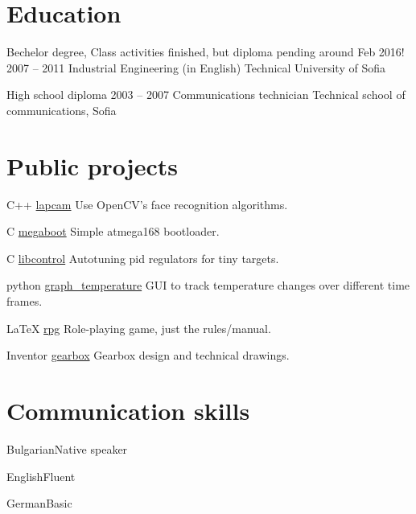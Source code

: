 \documentclass{tccv}
\begin{document}
\section{Education}
\begin{yearlist}
\item[Bechelor degree, \small \textsf{Class activities finished, but diploma pending around Feb 2016!}]{2007 -- 2011}
     {Industrial Engineering (in English)}
     {Technical University of Sofia}

\item[High school diploma]{2003 -- 2007}
     {Communications technician}
     {Technical school of communications, Sofia}
\end{yearlist}


\section{Public projects}
\begin{yearlist}
\item{C++}
     {\href{https://github.com/MiroslavVitkov/lapcam}{lapcam}}
     {Use OpenCV's face recognition algorithms.}

\item{C}
     {\href{https://github.com/MiroslavVitkov/megaboot}{megaboot}}
     {Simple atmega168 bootloader.}

\item{C}
     {\href{https://github.com/MiroslavVitkov/libcontrol}{libcontrol}}
     {Autotuning pid regulators for tiny targets.}

\item{python}
     {\href{https://github.com/MiroslavVitkov/graph_temperature}{graph\_temperature}}
     {GUI to track temperature changes over different time frames.}

\item{LaTeX}
     {\href{https://github.com/MiroslavVitkov/rpg}{rpg}}
     {Role-playing game, just the rules/manual. }

\item{Inventor}
     {\href{https://github.com/MiroslavVitkov/gearbox}{gearbox}}
     {Gearbox design and technical drawings.}
\end{yearlist}


\section{Communication skills}
\begin{factlist}
\item{Bulgarian}{Native speaker}
\item{English}{Fluent}
\item{German}{Basic}
\end{factlist}
\end{document}
